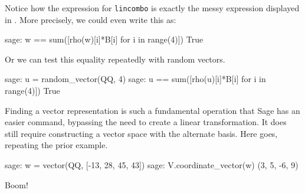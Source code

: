 %
Notice how the expression for \verb?lincombo? is exactly the messy expression displayed in . More precisely, we could even write this as:
%
\begin{sageexample}
sage: w == sum([rho(w)[i]*B[i] for i in range(4)])
True
\end{sageexample}
%
Or we can test this equality repeatedly with random vectors.
%
\begin{sageexample}
sage: u = random_vector(QQ, 4)
sage: u == sum([rho(u)[i]*B[i] for i in range(4)])
True
\end{sageexample}
%
Finding a vector representation is such a fundamental operation that Sage has an easier command, bypassing the need to create a linear transformation.  It does still require constructing a vector space with the alternate basis.  Here goes, repeating the prior example.
%
\begin{sageexample}
sage: w = vector(QQ, [-13, 28, 45, 43])
sage: V.coordinate_vector(w)
(3, 5, -6, 9)
\end{sageexample}
%
Boom!
%
\begin{sageverbatim}
\end{sageverbatim}
%
